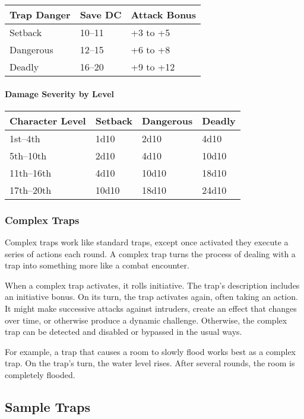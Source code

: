 \documentclass[
]{article}
\begin{document}
\begin{longtable}[]{@{}lll@{}}
\toprule
Trap Danger & Save DC & Attack Bonus\tabularnewline
\midrule
\endhead
Setback & 10--11 & +3 to +5\tabularnewline
Dangerous & 12--15 & +6 to +8\tabularnewline
Deadly & 16--20 & +9 to +12\tabularnewline
\bottomrule
\end{longtable}

\hypertarget{damage-severity-by-level}{%
\paragraph{Damage Severity by Level}\label{damage-severity-by-level}}

\begin{longtable}[]{@{}llll@{}}
\toprule
Character Level & Setback & Dangerous & Deadly\tabularnewline
\midrule
\endhead
1st--4th & 1d10 & 2d10 & 4d10\tabularnewline
5th--10th & 2d10 & 4d10 & 10d10\tabularnewline
11th--16th & 4d10 & 10d10 & 18d10\tabularnewline
17th--20th & 10d10 & 18d10 & 24d10\tabularnewline
\bottomrule
\end{longtable}

\hypertarget{complex-traps}{%
\subsubsection{Complex Traps}\label{complex-traps}}

Complex traps work like standard traps, except once activated they
execute a series of actions each round. A complex trap turns the process
of dealing with a trap into something more like a combat encounter.

When a complex trap activates, it rolls initiative. The trap's
description includes an initiative bonus. On its turn, the trap
activates again, often taking an action. It might make successive
attacks against intruders, create an effect that changes over time, or
otherwise produce a dynamic challenge. Otherwise, the complex trap can
be detected and disabled or bypassed in the usual ways.

For example, a trap that causes a room to slowly flood works best as a
complex trap. On the trap's turn, the water level rises. After several
rounds, the room is completely flooded.

\hypertarget{sample-traps}{%
\subsection{Sample Traps}\label{sample-traps}}
\end{document}
